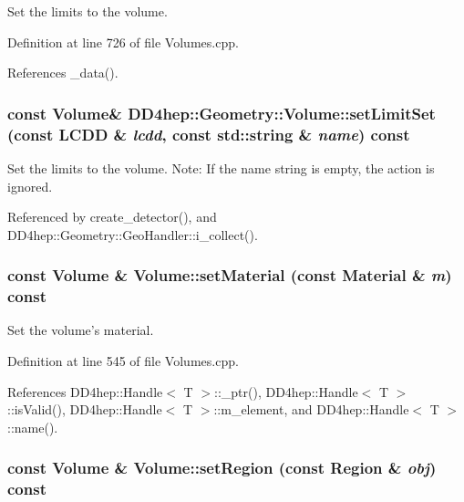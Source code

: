 Set the limits to the volume. 

Definition at line 726 of file Volumes.cpp.

References \_\-data().\hypertarget{class_d_d4hep_1_1_geometry_1_1_volume_a5c4e1991240829fbf7de49a281984550}{
\subsubsection[{setLimitSet}]{\setlength{\rightskip}{0pt plus 5cm}const {\bf Volume}\& DD4hep::Geometry::Volume::setLimitSet (const {\bf LCDD} \& {\em lcdd}, \/  const std::string \& {\em name}) const}}
\label{class_d_d4hep_1_1_geometry_1_1_volume_a5c4e1991240829fbf7de49a281984550}


Set the limits to the volume. Note: If the name string is empty, the action is ignored. 

Referenced by create\_\-detector(), and DD4hep::Geometry::GeoHandler::i\_\-collect().\hypertarget{class_d_d4hep_1_1_geometry_1_1_volume_a65caa62ff7fbf16f38cb85af994944c7}{
\subsubsection[{setMaterial}]{\setlength{\rightskip}{0pt plus 5cm}const {\bf Volume} \& Volume::setMaterial (const {\bf Material} \& {\em m}) const}}
\label{class_d_d4hep_1_1_geometry_1_1_volume_a65caa62ff7fbf16f38cb85af994944c7}


Set the volume's material. 

Definition at line 545 of file Volumes.cpp.

References DD4hep::Handle$<$ T $>$::\_\-ptr(), DD4hep::Handle$<$ T $>$::isValid(), DD4hep::Handle$<$ T $>$::m\_\-element, and DD4hep::Handle$<$ T $>$::name().\hypertarget{class_d_d4hep_1_1_geometry_1_1_volume_a9078b71f780beef0718462d48c0fda0f}{
\subsubsection[{setRegion}]{\setlength{\rightskip}{0pt plus 5cm}const {\bf Volume} \& Volume::setRegion (const {\bf Region} \& {\em obj}) const}}
\label{class_d_d4hep_1_1_geometry_1_1_volume_a9078b71f780beef0718462d48c0fda0f}


